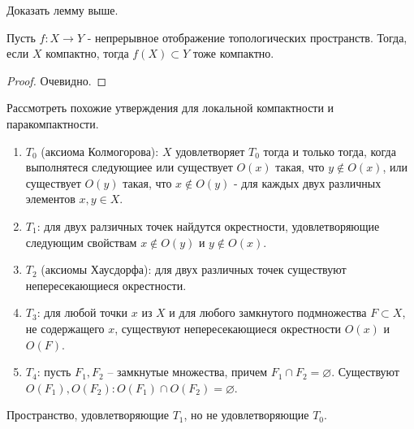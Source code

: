 \begin{exercise}
    Доказать лемму выше.
\end{exercise}

\begin{statement}
    Пусть $f: X \to Y$ - непрерывное отображение топологических пространств.
    Тогда, если $X$ компактно, тогда $f(X) \subset Y$ тоже компактно.
\end{statement}
\begin{proof}
    Очевидно.
\end{proof}

\begin{exercise}
    Рассмотреть похожие утверждения для локальной компактности и паракомпактности.
\end{exercise}

\begin{definition}
    \begin{enumerate}
        \item $T_0$ (аксиома Колмогорова): $X$ удовлетворяет $T_0$ тогда и только тогда, когда выполнятеся следующиее или существует $O(x)$ такая, что $y \notin O(x)$, или существует $O(y)$ такая, что $x \notin O(y)$ - для каждых двух различных элементов $x, y \in X$.
        \item $T_1$: для двух ралзичных точек найдутся окрестности, удовлетворяющие следующим свойствам $x \notin O(y)$ и $y \notin O(x)$.
        \item $T_2$ (аксиомы Хаусдорфа): для двух различных точек существуют непересекающиеся окрестности.
        \item $T_3$: для любой точки $x$ из $X$ и для любого замкнутого подмножества $F \subset X$, не содержащего $x$, существуют непересекающиеся окрестности $O(x)$ и $O(F)$.
        \item $T_4$: пусть $F_1, F_2$ -- замкнутые множества, причем $F_1 \cap F_2 = \varnothing$. Существуют $O(F_1), O(F_2): O(F_1) \cap O(F_2) = \varnothing$.
    \end{enumerate}
\end{definition}

\begin{exercise}
    Пространство, удовлетворяющие $T_1$, но не удовлетворяющие $T_0$.
\end{exercise}

